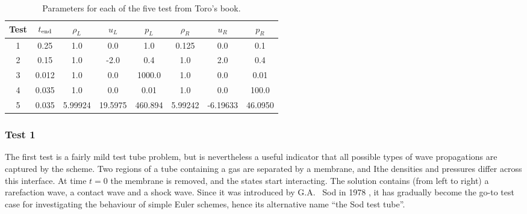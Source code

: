 \documentclass[final,3p,twocolumn]{elsarticle}
\begin{document}
\begin{table*}[htb]
    \centering
    \begin{tabular}{cccccccc}
        \hline 
        Test & $t_{\rm end}$ & $\rho_L$ & $u_L$ & $p_L$ & $\rho_R$ & $u_R$ & $p_R$ \\
        \hline 
        1 & 0.25 & 1.0 & 0.0 & 1.0 & 0.125 & 0.0 & 0.1 \\
        2 & 0.15 & 1.0 & -2.0 & 0.4 & 1.0 & 2.0 & 0.4 \\
        3 & 0.012 & 1.0 & 0.0 & 1000.0 & 1.0 & 0.0 & 0.01 \\
        4 & 0.035 & 1.0 & 0.0 & 0.01 & 1.0 & 0.0 & 100.0 \\
        5 & 0.035 & 5.99924 & 19.5975 & 460.894 & 5.99242 & -6.19633 & 46.0950 \\
        \hline
    \end{tabular}
    \caption{Parameters for each of the five test from Toro's book.}
    \label{tab:toro}
\end{table*}

\subsubsection{Test 1}
The first test is a fairly mild test tube problem, but is nevertheless a useful
indicator that all possible types of wave propagations are captured by the
scheme. Two regions of a tube containing a gas are separated by a membrane, and
Ithe densities and pressures differ across this interface. At time $t=0$ the
membrane is removed, and the states start interacting. The solution contains
(from left to right) a rarefaction wave, a contact wave and a shock wave. Since
it was introduced by G.A.~ Sod in 1978 \cite{sod1978survey}, it has gradually
become the go-to test case for investigating the behaviour of simple Euler
schemes, hence its alternative name ``the Sod test tube''.

\end{document}
